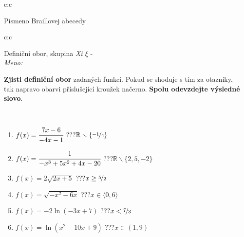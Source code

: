 \documentclass[10pt]{report}
\begin{document}
\begin{tabular}{c:c}
\begin{minipage}[c][104.5mm][t]{0.5\linewidth}
\begin{center}
\begin{minipage}{0.20\linewidth}
\begin{center}
{\small Písmeno Braillovej abecedy}
\end{center}
\end{minipage}
\end{center}
\end{minipage}
%
\end{tabular}
\newpage
\thispagestyle{empty}
\begin{tabular}{c:c}
\begin{minipage}[c][104.5mm][t]{0.5\linewidth}
\begin{center}
\vspace{7mm}
{\huge Definiční obor, skupina \textit{Xi $\xi$} -}\\[5mm]
\textit{Meno:}\phantom{xxxxxxxxxxxxxxxxxxxxxxxxxxxxxxxxxxxxxxxxxxxxxxxxxxxxxxxxxxxxxxxxx}\\[5mm]
\begin{minipage}{0.95\linewidth}
\textbf{Zjisti definiční obor} zadaných funkcí. Pokud se shoduje s tím za otazníky,\\tak napravo obarvi příslušející kroužek načerno. \textbf{Spolu odevzdejte výsledné slovo}.
\end{minipage}
\\[1mm]
\begin{minipage}{0.79\linewidth}
\begin{center}
\begin{varwidth}{\linewidth}
\begin{enumerate}
\normalsizerrr
\item $f(x)=\cfrac{7x-6}{-4x-1}$\quad \dotfill\; ???\;\dotfill \quad $\mathbb{R}\smallsetminus\{\nicefrac{-1}{4}\}$
\item $f(x)=\cfrac{1}{-x^3+5x^2+4x-20}$\quad \dotfill\; ???\;\dotfill \quad $\mathbb{R}\smallsetminus\{2,5,-2\}$
\item $f(x)=2\sqrt{2x+5}$\quad \dotfill\; ???\;\dotfill \quad $x\geq\nicefrac{5}{2}$
\item $f(x)=\sqrt{-x^2-6x}$\quad \dotfill\; ???\;\dotfill \quad $x\in\langle0 , 6\rangle$
\item $f(x)=-2\ln{(-3x+7)}$\quad \dotfill\; ???\;\dotfill \quad $x<\nicefrac{7}{3}$
\item $f(x)=\ln{(x^2-10x+9)}$\quad \dotfill\; ???\;\dotfill \quad $x\in(1 , 9)$
\end{enumerate}
\end{varwidth}
\end{center}
\end{minipage}
\begin{minipage}{0.20\linewidth}

\end{minipage}
\end{center}
\end{minipage}
\end{tabular}
\end{document}
